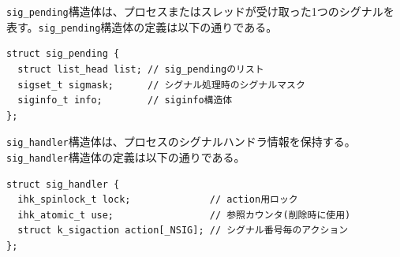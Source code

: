 \documentclass[twoside,11pt,fleqn]{book}
\newcounter{subsubsubsection}[subsubsection]
\begin{document}
{
\texttt{sig\_pending}構造体は、プロセスまたはスレッドが受け取った1つのシグナルを表す。\texttt{sig\_pending}構造体の定義は以下の通りである。
\begin{verbatim}
struct sig_pending {
  struct list_head list; // sig_pendingのリスト
  sigset_t sigmask;      // シグナル処理時のシグナルマスク
  siginfo_t info;        // siginfo構造体
};
\end{verbatim}

\texttt{sig\_handler}構造体は、プロセスのシグナルハンドラ情報を保持する。\texttt{sig\_handler}構造体の定義は以下の通りである。
\begin{verbatim}
struct sig_handler {
  ihk_spinlock_t lock;              // action用ロック
  ihk_atomic_t use;                 // 参照カウンタ(削除時に使用)
  struct k_sigaction action[_NSIG]; // シグナル番号毎のアクション
};
\end{verbatim}
}
\end{document}
